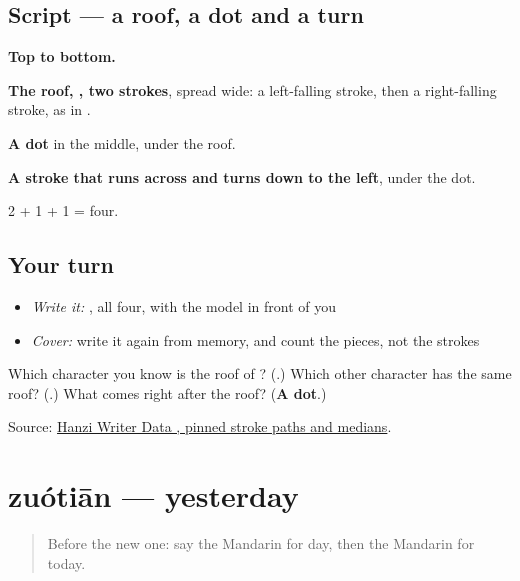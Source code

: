 \subsection*{Script — a roof, a dot and a turn}

\begin{quote}
\end{quote}

\textbf{Top to bottom.}

\textbf{The roof, , two strokes}, spread wide: a left-falling stroke, then a right-falling stroke, as in .

\textbf{A dot} in the middle, under the roof.

\textbf{A stroke that runs across and turns down to the left}, under the dot.

2 + 1 + 1 = four.

\subsection*{Your turn}
\begin{itemize}
\raggedright
  \item \emph{Write it:} , all four, with the model in front of you
  \item \emph{Cover:} write it again from memory, and count the pieces, not the strokes
\end{itemize}

\begin{tcolorbox}[breakable,colback=teal!4,colframe=teal!35!black,title={Before you move on}]
Which character you know is the roof of ? (\textbf{}.) Which other character has the same roof? (\textbf{}.) What comes right after the roof? (\textbf{A dot}.)

Source: \href{https://raw.githubusercontent.com/chanind/hanzi-writer-data/68d10a4b21150cae5e1ebbd223eed289cf32d90c/data/\%E4\%BB\%8A.json}{Hanzi Writer Data , pinned stroke paths and medians}.
\end{tcolorbox}
\section[zuótiān]{zuótiān — yesterday}

\label{lesson:ZH-C45-zuotian}



\begin{quote}
Before the new one: say the Mandarin for day, then the Mandarin for today.
\end{quote}

